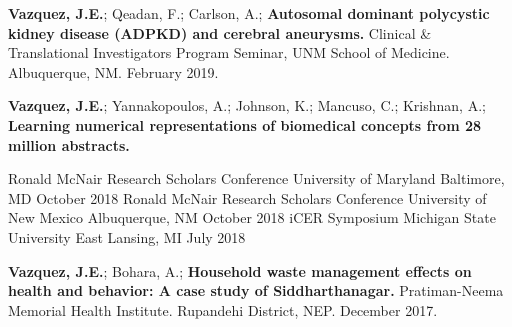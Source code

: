 \begin{cventries}
{\begin{etaremune}
    \item {\bf Vazquez, J.E.}; Qeadan, F.; Carlson, A.; \textbf{Autosomal dominant polycystic 
          kidney disease (ADPKD) and cerebral aneurysms.} Clinical \& Translational Investigators 
          Program Seminar, UNM School of Medicine. Albuquerque, NM. February 2019.

    \item {\bf Vazquez, J.E.}; Yannakopoulos, A.; Johnson, K.; Mancuso, C.; Krishnan, A.; 
          \textbf{Learning numerical representations of biomedical concepts from 28 million abstracts.}
    
    \begin{cvhonors_smaller}
      \cvhonor
        {Ronald McNair Research Scholars Conference}
        {University of Maryland}
        {Baltimore, MD}
        {October 2018}
      \cvhonor
        {Ronald McNair Research Scholars Conference}
        {University of New Mexico}
        {Albuquerque, NM}
        {October 2018}
      \cvhonor
        {iCER Symposium}
        {Michigan State University}
        {East Lansing, MI}
        {July 2018}
    \end{cvhonors_smaller}

    \item {\bf Vazquez, J.E.}; Bohara, A.; \textbf{Household waste management effects on health 
          and behavior: A case study of Siddharthanagar.} Pratiman-Neema Memorial Health Institute. 
          Rupandehi District, NEP. December 2017.

\end{etaremune}
}


\end{cventries}
